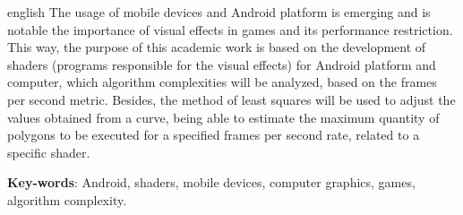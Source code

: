 \begin{resumo}[Abstract]
 \begin{otherlanguage*}{english}
  	The usage of mobile devices and Android platform is emerging and is notable the importance of visual effects in games and its performance restriction. This way, the purpose of this academic work is based on the development of shaders (programs responsible for the visual effects) for Android platform and computer, which algorithm complexities will be analyzed, based on the frames per second metric. Besides, the method of least squares will be used to adjust the values obtained from a curve, being able to estimate the maximum quantity of polygons to be executed for a specified frames per second rate, related to a specific shader.  

   \vspace{\onelineskip}
 
   \noindent 
   \textbf{Key-words}: Android, shaders, mobile devices, computer graphics, games, algorithm complexity. 
 \end{otherlanguage*}
\end{resumo}
